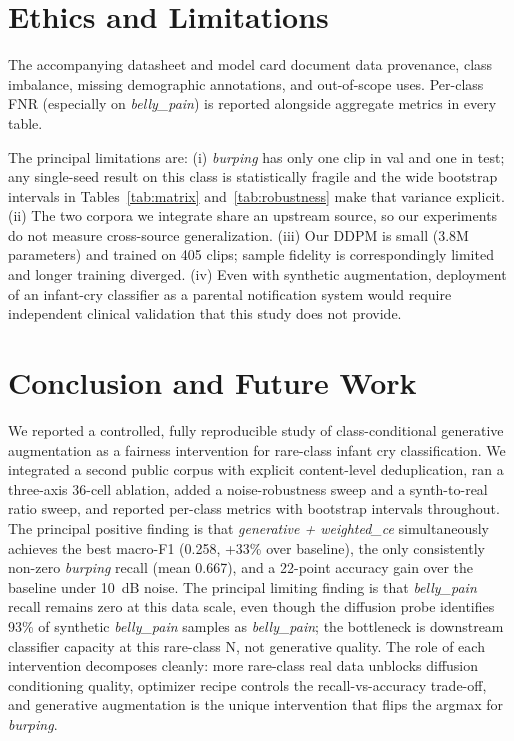 \documentclass[10pt]{article}
\begin{document}
\section{Ethics and Limitations}\label{sec:ethicslim}
The accompanying datasheet and model card document data provenance, class imbalance, missing demographic annotations, and out-of-scope uses. Per-class FNR (especially on \textit{belly\_pain}) is reported alongside aggregate metrics in every table.

The principal limitations are: (i) \textit{burping} has only one clip in val and one in test; any single-seed result on this class is statistically fragile and the wide bootstrap intervals in Tables~\ref{tab:matrix} and~\ref{tab:robustness} make that variance explicit. (ii) The two corpora we integrate share an upstream source, so our experiments do not measure cross-source generalization. (iii) Our DDPM is small (3.8M parameters) and trained on 405 clips; sample fidelity is correspondingly limited and longer training diverged. (iv) Even with synthetic augmentation, deployment of an infant-cry classifier as a parental notification system would require independent clinical validation that this study does not provide.

\section{Conclusion and Future Work}\label{sec:concl}
We reported a controlled, fully reproducible study of class-conditional generative augmentation as a fairness intervention for rare-class infant cry classification. We integrated a second public corpus with explicit content-level deduplication, ran a three-axis 36-cell ablation, added a noise-robustness sweep and a synth-to-real ratio sweep, and reported per-class metrics with bootstrap intervals throughout. The principal positive finding is that \textit{generative + weighted\_ce} simultaneously achieves the best macro-F1 (0.258, +33\% over baseline), the only consistently non-zero \textit{burping} recall (mean 0.667), and a 22-point accuracy gain over the baseline under 10~dB noise. The principal limiting finding is that \textit{belly\_pain} recall remains zero at this data scale, even though the diffusion probe identifies 93\% of synthetic \textit{belly\_pain} samples as \textit{belly\_pain}; the bottleneck is downstream classifier capacity at this rare-class N, not generative quality. The role of each intervention decomposes cleanly: more rare-class real data unblocks diffusion conditioning quality, optimizer recipe controls the recall-vs-accuracy trade-off, and generative augmentation is the unique intervention that flips the argmax for \textit{burping}.
\end{document}
